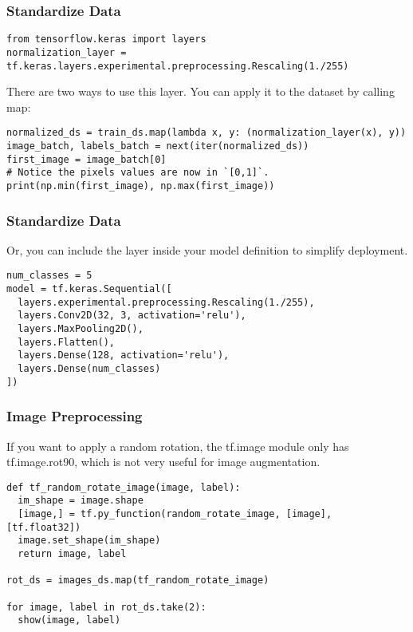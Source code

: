 \begin{frame}[fragile]\frametitle{Standardize Data}

\begin{lstlisting}
from tensorflow.keras import layers
normalization_layer = tf.keras.layers.experimental.preprocessing.Rescaling(1./255)
\end{lstlisting}

There are two ways to use this layer. You can apply it to the dataset by calling map:

\begin{lstlisting}
normalized_ds = train_ds.map(lambda x, y: (normalization_layer(x), y))
image_batch, labels_batch = next(iter(normalized_ds))
first_image = image_batch[0]
# Notice the pixels values are now in `[0,1]`.
print(np.min(first_image), np.max(first_image)) 
\end{lstlisting}


\end{frame}

\begin{frame}[fragile]\frametitle{Standardize Data}

Or, you can include the layer inside your model definition to simplify deployment.

\begin{lstlisting}
num_classes = 5
model = tf.keras.Sequential([
  layers.experimental.preprocessing.Rescaling(1./255),
  layers.Conv2D(32, 3, activation='relu'),
  layers.MaxPooling2D(),
  layers.Flatten(),
  layers.Dense(128, activation='relu'),
  layers.Dense(num_classes)
])
\end{lstlisting}

\end{frame}


\begin{frame}[fragile]\frametitle{Image Preprocessing}

If you want to apply a random rotation, the tf.image module only has tf.image.rot90, which is not very useful for image augmentation.

\begin{lstlisting}
def tf_random_rotate_image(image, label):
  im_shape = image.shape
  [image,] = tf.py_function(random_rotate_image, [image], [tf.float32])
  image.set_shape(im_shape)
  return image, label
	
rot_ds = images_ds.map(tf_random_rotate_image)

for image, label in rot_ds.take(2):
  show(image, label)
\end{lstlisting}
\end{frame}


